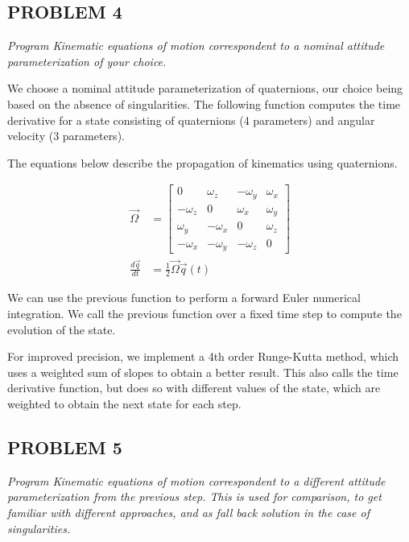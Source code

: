 \subsection{PROBLEM 4}
\textit{Program Kinematic equations of motion correspondent to a nominal attitude parameterization of your choice.}

We choose a nominal attitude parameterization of quaternions, our choice being based on the absence of singularities. The following function computes the time derivative for a state consisting of quaternions (4 parameters) and angular velocity (3 parameters).

The equations below describe the propagation of kinematics using quaternions.

\begin{align*}
\Vec{\Omega} &= 
    \begin{bmatrix}
    0 & \omega_{z} & -\omega_{y} & \omega_{x}\\
    -\omega_{z} & 0 & \omega_{x} & \omega_{y}\\
    \omega_{y} & -\omega_{x} & 0 & \omega_{z}\\
    -\omega_{x} & -\omega_{y} & -\omega_{z} & 0
    \end{bmatrix}\\
\frac{d \Vec{q}}{dt} &= \frac{1}{2} \Vec{\Omega} \Vec{q}(t)
\end{align*}



We can use the previous function to perform a forward Euler numerical integration. We call the previous function over a fixed time step to compute the evolution of the state.



For improved precision, we implement a 4th order Runge-Kutta method, which uses a weighted sum of slopes to obtain a better result. This also calls the time derivative function, but does so with different values of the state, which are weighted to obtain the next state for each step.




\subsection{PROBLEM 5}
\textit{Program Kinematic equations of motion correspondent to a different attitude parameterization from the previous step. This is used for comparison, to get familiar with different approaches, and as fall back solution in the case of singularities.}

